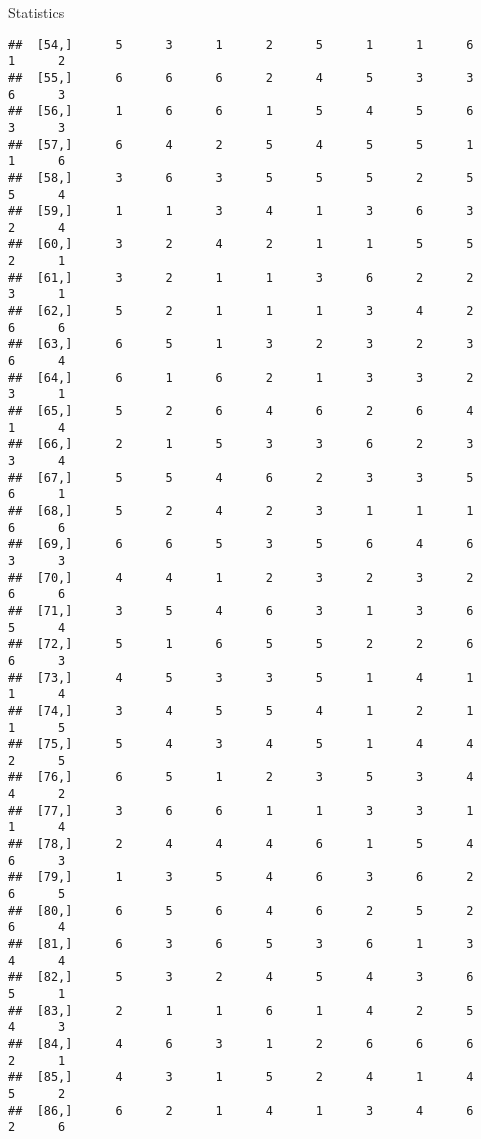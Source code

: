 \documentclass[
  ignorenonframetext,
]{beamer}
\begin{document}
\begin{frame}[fragile]{Statistics}
\begin{verbatim}
##  [54,]      5      3      1      2      5      1      1      6      1      2
##  [55,]      6      6      6      2      4      5      3      3      6      3
##  [56,]      1      6      6      1      5      4      5      6      3      3
##  [57,]      6      4      2      5      4      5      5      1      1      6
##  [58,]      3      6      3      5      5      5      2      5      5      4
##  [59,]      1      1      3      4      1      3      6      3      2      4
##  [60,]      3      2      4      2      1      1      5      5      2      1
##  [61,]      3      2      1      1      3      6      2      2      3      1
##  [62,]      5      2      1      1      1      3      4      2      6      6
##  [63,]      6      5      1      3      2      3      2      3      6      4
##  [64,]      6      1      6      2      1      3      3      2      3      1
##  [65,]      5      2      6      4      6      2      6      4      1      4
##  [66,]      2      1      5      3      3      6      2      3      3      4
##  [67,]      5      5      4      6      2      3      3      5      6      1
##  [68,]      5      2      4      2      3      1      1      1      6      6
##  [69,]      6      6      5      3      5      6      4      6      3      3
##  [70,]      4      4      1      2      3      2      3      2      6      6
##  [71,]      3      5      4      6      3      1      3      6      5      4
##  [72,]      5      1      6      5      5      2      2      6      6      3
##  [73,]      4      5      3      3      5      1      4      1      1      4
##  [74,]      3      4      5      5      4      1      2      1      1      5
##  [75,]      5      4      3      4      5      1      4      4      2      5
##  [76,]      6      5      1      2      3      5      3      4      4      2
##  [77,]      3      6      6      1      1      3      3      1      1      4
##  [78,]      2      4      4      4      6      1      5      4      6      3
##  [79,]      1      3      5      4      6      3      6      2      6      5
##  [80,]      6      5      6      4      6      2      5      2      6      4
##  [81,]      6      3      6      5      3      6      1      3      4      4
##  [82,]      5      3      2      4      5      4      3      6      5      1
##  [83,]      2      1      1      6      1      4      2      5      4      3
##  [84,]      4      6      3      1      2      6      6      6      2      1
##  [85,]      4      3      1      5      2      4      1      4      5      2
##  [86,]      6      2      1      4      1      3      4      6      2      6

\end{verbatim}
\end{frame}
\end{document}
